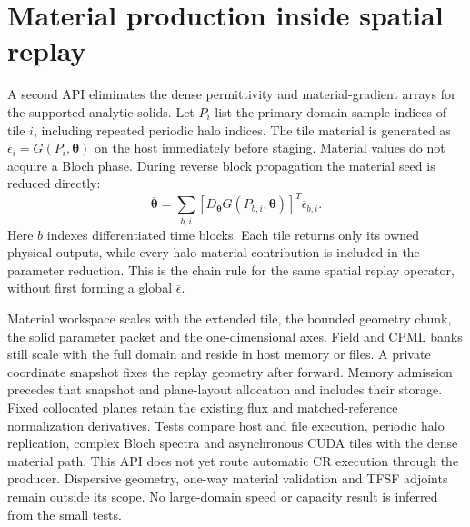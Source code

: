 \documentclass[11pt,a4paper]{article}
\begin{document}
\section{Material production inside spatial replay}
A second API eliminates the dense permittivity and material-gradient arrays
for the supported analytic solids. Let $P_i$ list the primary-domain sample
indices of tile $i$, including repeated periodic halo indices. The tile
material is generated as $\epsilon_i=G(P_i,\boldsymbol\theta)$ on the host
immediately before staging. Material values do not acquire a Bloch phase.
During reverse block propagation the material seed is reduced directly:
\begin{equation}
\overline{\boldsymbol\theta}=
\sum_{b,i}
\left[D_{\boldsymbol\theta}G(P_{b,i},\boldsymbol\theta)\right]^T
\overline{\epsilon}_{b,i}.
\end{equation}
Here $b$ indexes differentiated time blocks. Each tile returns only its owned
physical outputs, while every halo material contribution is included in the
parameter reduction. This is the chain rule for the same spatial replay
operator, without first forming a global $\overline\epsilon$.

Material workspace scales with the extended tile, the bounded geometry chunk,
the solid parameter packet and the one-dimensional axes. Field and CPML banks
still scale with the full domain and reside in host memory or files.
A private coordinate snapshot fixes the replay geometry after forward.
Memory admission precedes that snapshot and plane-layout allocation and
includes their storage. Fixed collocated planes retain the existing flux
and matched-reference normalization derivatives. Tests compare host and
file execution, periodic halo replication, complex Bloch spectra and
asynchronous CUDA tiles with the dense material path. This API does not
yet route automatic CR execution through the producer. Dispersive geometry,
one-way material validation and TFSF adjoints remain outside its scope.
No large-domain speed or capacity result is inferred from the small tests.
\end{document}
